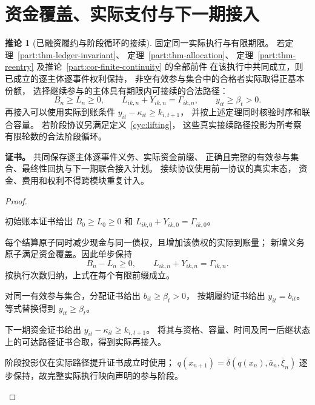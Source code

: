 \documentclass[UTF8,12pt,a4paper,openany,fontset=none,zihao=false]{ctexrep}
\theoremstyle{definition}
\newtheorem{corollary}{推论}[chapter]
\newenvironment{certificate}{\par\noindent\textbf{证书。}\ignorespaces}{\par}
\newcommand{\1}{\mathbf 1}
\begin{document}
\section{资金覆盖、实际支付与下一期接入}
\begin{corollary}[已融资履约与阶段循环的接续]
\label{cyc:funded-continuity}
\label{cyc:solvency}
\label{cyc:base-payment}
固定同一实际执行与有限期限。
若定理~\ref{part:thm-ledger-invariant}、
定理~\ref{part:thm-allocation}、
定理~\ref{part:thm-reentry}
及推论~\ref{part:cor-finite-continuity} 的全部前件
在该执行中共同成立，则已成立的逐主体逐事件权利保持，
非空有效参与集合中的合格者实际取得正基本份额，
选择继续参与的主体具有期限内可接续的合法路径：
\[
B_n\ge L_n\ge0,\qquad
L_{ik,n}+Y_{ik,n}=\Gamma_{ik,n},\qquad
y_{it}\ge\beta_t>0.
\]
再接入可以使用实际到账条件
\(y_{it}-\kappa_{it}\ge k_{i,t+1}\)，
并按上述定理同时核验时序和联合容量。
若阶段协议另满足定义~\ref{cyc:lifting}，
这些真实接续路径投影为所考察有限轮数的合法阶段循环。
\end{corollary}
\begin{certificate}
共同保存逐主体逐事件义务、实际资金前缀、
正确且完整的有效参与集合、最终性回执与下一期联合接入计划。
接续协议使用前一协议的真实末态，
资金、费用和权利不得跨模块重复计入。
\end{certificate}
\begin{proof}
\begin{semanticsteps}
\item 初始账本证书给出 \(B_0\ge L_0\ge0\) 和
\(L_{ik,0}+Y_{ik,0}=\Gamma_{ik,0}\)。
\item 每个结算原子同时减少现金与同一债权，且增加该债权的实际到账量；
新增义务原子满足资金覆盖。因此单步保持
\[
B_n-L_n\ge0,\qquad L_{ik,n}+Y_{ik,n}=\Gamma_{ik,n}.
\]
按执行次数归纳，上式在每个有限前缀成立。
\item 对同一有效参与集合，分配证书给出 \(b_{it}\ge\beta_t>0\)，
按期履约证书给出 \(y_{it}=b_{it}\)。等式替换得到 \(y_{it}\ge\beta_t\)。
\item 下一期资金证书给出 \(y_{it}-\kappa_{it}\ge k_{i,t+1}\)。
将其与资格、容量、时间及同一后继状态上的可达路径证书合取，得到实际再接入。
\item 阶段投影仅在实际路径提升证书成立时使用；
\(q(x_{n+1})=\bar\delta(q(x_n),\bar a_n,\bar\xi_n)\)
逐步保持，故完整实际执行映向声明的参与阶段。
\end{semanticsteps}
\end{proof}
\end{document}
